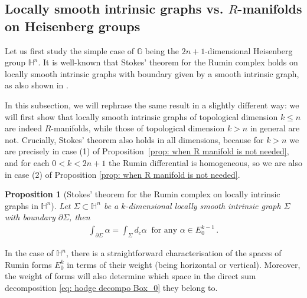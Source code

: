 \documentclass[dvipsnames]{amsart}
\newtheorem{proposition}[theorem]{Proposition}
\theoremstyle{definition}
\theoremstyle{definition}
\numberwithin{equation}{section}
\newcommand{\G}{\mathbb{G}}
\renewcommand{\H}{\mathbb{H}}
\begin{document}
\subsection{Locally smooth intrinsic graphs vs. $R$-manifolds on Heisenberg groups}\label{subsection: R mflds Heisenberg}
Let us first study the simple case of $\G$ being the $2n+1$-dimensional Heisenberg group $\mathbb H^n$. It is well-known that Stokes' theorem for the Rumin complex holds on locally smooth intrinsic graphs with boundary given by a smooth intrinsic graph, as also shown in \cite{StokesFranchi,FranchiSerapioni,DiMJulNGoloVit25}. 

In this subsection, we will rephrase the same result in a slightly different way: we will first show that locally  smooth intrinsic graphs of topological dimension $k\le n$ are indeed $R$-manifolds, while those of topological dimension $k> n$ in general are not. Crucially, Stokes' theorem also holds in all dimensions, because for $k>n$ we are precisely in case (1) of Proposition~\ref{prop: when R manifold is not needed}, and for each $0<k<2n+1$ the Rumin differential is homogeneous, so we are also in case (2) of Proposition \ref{prop: when R manifold is not needed}. 
\begin{proposition}[Stokes' theorem for the Rumin complex on locally intrinsic graphs in $\H^n$]\label{prop: stokes on heisenberg groups}
    Let $\Sigma\subset\mathbb H^n$ be a $k$-dimensional locally smooth intrinsic graph $\Sigma$ with boundary $\partial\Sigma$, then
    \begin{align*}
        \int_{\partial \Sigma}\alpha=\int_\Sigma d_c\alpha\ \text{ for any }\alpha\in E_0^{k-1}\,.
    \end{align*}
\end{proposition}

       In the case of $\mathbb H^n$, there is a straightforward characterisation of the spaces of Rumin forms $E_0^k$ in terms of their weight (being horizontal or vertical). Moreover, the weight of forms will also determine which space in the direct sum decomposition \eqref{eq: hodge decompo Box_0} they belong to.
       
\end{document}
